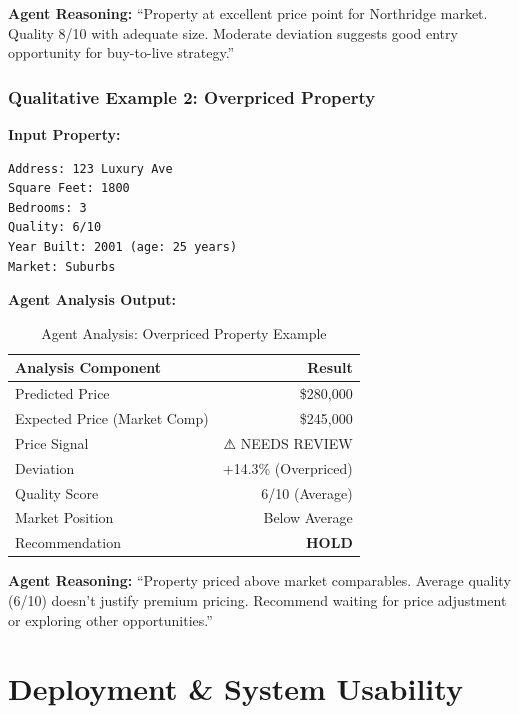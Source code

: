 \documentclass[11pt,a4paper]{article}
\begin{document}
\textbf{Agent Reasoning:}
``Property at excellent price point for Northridge market. Quality 8/10 with adequate size. Moderate deviation suggests good entry opportunity for buy-to-live strategy.''

\subsubsection{Qualitative Example 2: Overpriced Property}

\textbf{Input Property:}
\begin{lstlisting}
Address: 123 Luxury Ave
Square Feet: 1800
Bedrooms: 3
Quality: 6/10
Year Built: 2001 (age: 25 years)
Market: Suburbs
\end{lstlisting}

\textbf{Agent Analysis Output:}

\begin{table}[h!]
    \centering
    \small
    \begin{tabular}{lr}
        \toprule
        \textbf{Analysis Component} & \textbf{Result} \\
        \midrule
        Predicted Price & \$280,000 \\
        Expected Price (Market Comp) & \$245,000 \\
        Price Signal & ⚠ NEEDS REVIEW \\
        Deviation & +14.3\% (Overpriced) \\
        Quality Score & 6/10 (Average) \\
        Market Position & Below Average \\
        Recommendation & \textbf{HOLD} \\
        \bottomrule
    \end{tabular}
    \caption{Agent Analysis: Overpriced Property Example}
\end{table}

\textbf{Agent Reasoning:}
``Property priced above market comparables. Average quality (6/10) doesn't justify premium pricing. Recommend waiting for price adjustment or exploring other opportunities.''

\pagebreak

\section{Deployment \& System Usability}
\end{document}
